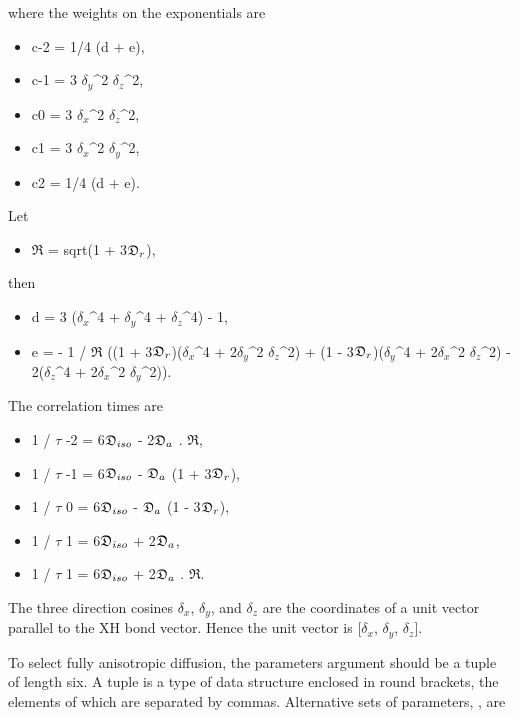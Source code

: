 where the weights on the exponentials are


\begin{itemize}
\item[] c-2 = 1/4 (d + e), 
\item[] c-1 = 3 $\delta_y$\^{}2 $\delta_z$\^{}2, 
\item[] c0  = 3 $\delta_x$\^{}2 $\delta_z$\^{}2, 
\item[] c1  = 3 $\delta_x$\^{}2 $\delta_y$\^{}2, 
\item[] c2  = 1/4 (d + e). 
\end{itemize}


Let


\begin{itemize}
\item[] $\mathfrak{R}$ = sqrt(1 + 3$\mathfrak{D}_r$), 
\end{itemize}


then


\begin{itemize}
\item[] d = 3 ($\delta_x$\^{}4 + $\delta_y$\^{}4 + $\delta_z$\^{}4) - 1, 
\item[] e = - 1 / $\mathfrak{R}$ ((1 + 3$\mathfrak{D}_r$)($\delta_x$\^{}4 + 2$\delta_y$\^{}2 $\delta_z$\^{}2) + (1 - 3$\mathfrak{D}_r$)($\delta_y$\^{}4 + 2$\delta_x$\^{}2 $\delta_z$\^{}2) - 2($\delta_z$\^{}4 + 2$\delta_x$\^{}2 $\delta_y$\^{}2)). 
\end{itemize}


The correlation times are


\begin{itemize}
\item[] 1 / $\tau$ -2 = 6$\mathfrak{D}_{iso}$ - 2$\mathfrak{D}_a$ . $\mathfrak{R}$, 
\item[] 1 / $\tau$ -1 = 6$\mathfrak{D}_{iso}$ - $\mathfrak{D}_a$ (1 + 3$\mathfrak{D}_r$), 
\item[] 1 / $\tau$ 0  = 6$\mathfrak{D}_{iso}$ - $\mathfrak{D}_a$ (1 - 3$\mathfrak{D}_r$), 
\item[] 1 / $\tau$ 1  = 6$\mathfrak{D}_{iso}$ + 2$\mathfrak{D}_a$, 
\item[] 1 / $\tau$ 1  = 6$\mathfrak{D}_{iso}$ + 2$\mathfrak{D}_a$ . $\mathfrak{R}$. 
\end{itemize}


The three direction cosines $\delta_x$, $\delta_y$, and $\delta_z$ are the coordinates of a unit vector parallel to the XH bond vector.  Hence the unit vector is [$\delta_x$, $\delta_y$, $\delta_z$].


To select fully anisotropic diffusion, the parameters argument should be a tuple of length six.  A tuple is a type of data structure enclosed in round brackets, the elements of which are separated by commas.  Alternative sets of parameters, , are


